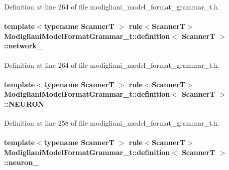 Definition at line 264 of file modigliani\_\-model\_\-format\_\-grammar\_\-t.h.

\paragraph[{network\_\-}]{\setlength{\rightskip}{0pt plus 5cm}template$<$typename ScannerT $>$ rule$<$ScannerT$>$ {\bf ModiglianiModelFormatGrammar\_\-t::definition}$<$ ScannerT $>$::{\bf network\_\-}}\hfill\label{struct_modigliani_model_format_grammar__t_1_1definition_a253d23c593b32637a504d03c9f8e7fa1}


Definition at line 264 of file modigliani\_\-model\_\-format\_\-grammar\_\-t.h.

\paragraph[{NEURON}]{\setlength{\rightskip}{0pt plus 5cm}template$<$typename ScannerT $>$ rule$<$ScannerT$>$ {\bf ModiglianiModelFormatGrammar\_\-t::definition}$<$ ScannerT $>$::{\bf NEURON}}\hfill\label{struct_modigliani_model_format_grammar__t_1_1definition_ab3834162bbaa0ed71ea989dd197d71c3}


Definition at line 258 of file modigliani\_\-model\_\-format\_\-grammar\_\-t.h.

\paragraph[{neuron\_\-}]{\setlength{\rightskip}{0pt plus 5cm}template$<$typename ScannerT $>$ rule$<$ScannerT$>$ {\bf ModiglianiModelFormatGrammar\_\-t::definition}$<$ ScannerT $>$::{\bf neuron\_\-}}\hfill\label{struct_modigliani_model_format_grammar__t_1_1definition_a7c2a30b6aea9934d91294d2a2dee9113}



